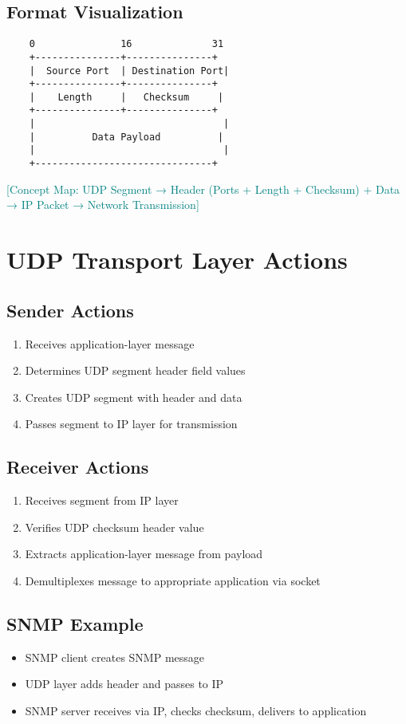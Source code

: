 \documentclass[12pt]{article}
\begin{document}
\subsection{Format Visualization}
\begin{verbatim}
    0               16              31
    +---------------+---------------+ 
    |  Source Port  | Destination Port|
    +---------------+---------------+ 
    |    Length     |   Checksum     |
    +---------------+---------------+ 
    |                                 |
    |          Data Payload          |
    |                                 |
    +-------------------------------+
\end{verbatim}

\textcolor{teal}{[Concept Map: UDP Segment → Header (Ports + Length + Checksum) + Data → IP Packet → Network Transmission]}

\section{UDP Transport Layer Actions}

\subsection{Sender Actions}
\begin{enumerate}
    \item Receives application-layer message
    \item Determines UDP segment header field values
    \item Creates UDP segment with header and data
    \item Passes segment to IP layer for transmission
\end{enumerate}

\subsection{Receiver Actions}
\begin{enumerate}
    \item Receives segment from IP layer
    \item Verifies UDP checksum header value
    \item Extracts application-layer message from payload
    \item Demultiplexes message to appropriate application via socket
\end{enumerate}

\subsection{SNMP Example}
\begin{itemize}
    \item SNMP client creates SNMP message
    \item UDP layer adds header and passes to IP
    \item SNMP server receives via IP, checks checksum, delivers to application
\end{itemize}
\end{document}
